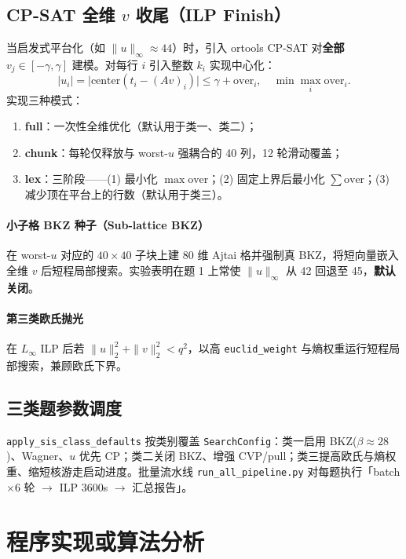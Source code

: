 \documentclass[12pt,a4paper]{ctexart}
\begin{document}
\subsection{CP-SAT 全维 $v$ 收尾（ILP Finish）}

当启发式平台化（如 $\|u\|_{\infty}\approx 44$）时，引入 ortools CP-SAT 对\textbf{全部} $v_j\in[-\gamma,\gamma]$ 建模。对每行 $i$ 引入整数 $k_i$ 实现中心化：
\[
  |u_i| = \bigl|\mathrm{center}(t_i-(Av)_i)\bigr| \le \gamma + \mathrm{over}_i,\quad \min \max_i \mathrm{over}_i.
\]
实现三种模式：
\begin{enumerate}
  \item \textbf{full}：一次性全维优化（默认用于类一、类二）；
  \item \textbf{chunk}：每轮仅释放与 worst-$u$ 强耦合的 40 列，12 轮滑动覆盖；
  \item \textbf{lex}：三阶段——(1) 最小化 $\max\mathrm{over}$；(2) 固定上界后最小化 $\sum\mathrm{over}$；(3) 减少顶在平台上的行数（默认用于类三）。
\end{enumerate}

\paragraph{小子格 BKZ 种子（Sub-lattice BKZ）}
在 worst-$u$ 对应的 $40\times40$ 子块上建 80 维 Ajtai 格并强制真 BKZ，将短向量嵌入全维 $v$ 后短程局部搜索。实验表明在题 1 上常使 $\|u\|_{\infty}$ 从 42 回退至 45，\textbf{默认关闭}。

\paragraph{第三类欧氏抛光}
在 $L_{\infty}$ ILP 后若 $\|u\|_2^2+\|v\|_2^2<q^2$，以高 \texttt{euclid\_weight} 与熵权重运行短程局部搜索，兼顾欧氏下界。

\subsection{三类题参数调度}

\texttt{apply\_sis\_class\_defaults} 按类别覆盖 \texttt{SearchConfig}：类一启用 BKZ($\beta\approx28$)、Wagner、$u$ 优先 CP；类二关闭 BKZ、增强 CVP/pull；类三提高欧氏与熵权重、缩短核游走启动进度。批量流水线 \texttt{run\_all\_pipeline.py} 对每题执行「batch $\times$6 轮 $\to$ ILP 3600s $\to$ 汇总报告」。

\section{程序实现或算法分析}
\end{document}
